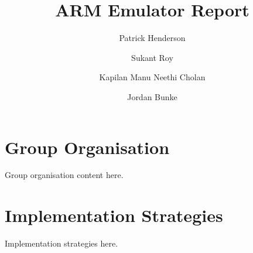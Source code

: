 \documentclass[11pt]{article}
\begin{document}
\title{ARM Emulator Report}
\author{
    Patrick Henderson\\
    \and
    Sukant Roy\\
    \and 
  	Kapilan Manu Neethi Cholan\\
  	\and 
  	Jordan Bunke
}

\maketitle

\section{Group Organisation}

	Group organisation content here.

\section{Implementation Strategies}

	Implementation strategies here.
\end{document}
